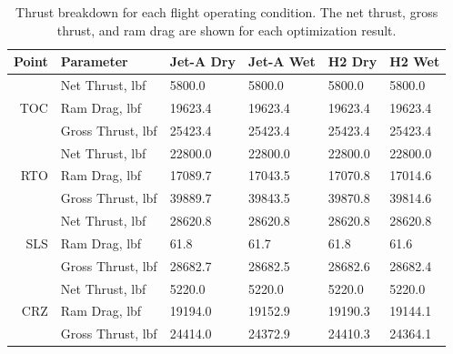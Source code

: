 \documentclass[conf]{new-aiaa}
\begin{document}
\begin{table}[hbt!]
    \centering
    \caption{Thrust breakdown for each flight operating condition.
        The net thrust, gross thrust, and ram drag are shown for each optimization result.
    }
    \small
    \renewcommand{\arraystretch}{1.2}
    \begin{tabular}{r l l l l l}
        Point & Parameter              & Jet-A Dry & Jet-A Wet & H2 Dry  & H2 Wet  \\
        \toprule
              & Net Thrust, \si{lbf}   & 5800.0    & 5800.0    & 5800.0  & 5800.0  \\
        TOC   & Ram Drag, \si{lbf}     & 19623.4   & 19623.4   & 19623.4 & 19623.4 \\
              & Gross Thrust, \si{lbf} & 25423.4   & 25423.4   & 25423.4 & 25423.4 \\
        \hline
              & Net Thrust, \si{lbf}   & 22800.0   & 22800.0   & 22800.0 & 22800.0 \\
        RTO   & Ram Drag, \si{lbf}     & 17089.7   & 17043.5   & 17070.8 & 17014.6 \\
              & Gross Thrust, \si{lbf} & 39889.7   & 39843.5   & 39870.8 & 39814.6 \\
        \hline
              & Net Thrust, \si{lbf}   & 28620.8   & 28620.8   & 28620.8 & 28620.8 \\
        SLS   & Ram Drag, \si{lbf}     & 61.8      & 61.7      & 61.8    & 61.6    \\
              & Gross Thrust, \si{lbf} & 28682.7   & 28682.5   & 28682.6 & 28682.4 \\
        \hline
              & Net Thrust, \si{lbf}   & 5220.0    & 5220.0    & 5220.0  & 5220.0  \\
        CRZ   & Ram Drag, \si{lbf}     & 19194.0   & 19152.9   & 19190.3 & 19144.1 \\
              & Gross Thrust, \si{lbf} & 24414.0   & 24372.9   & 24410.3 & 24364.1 \\
        \bottomrule
    \end{tabular}
    \label{tab:thrust}
\end{table}
\end{document}
